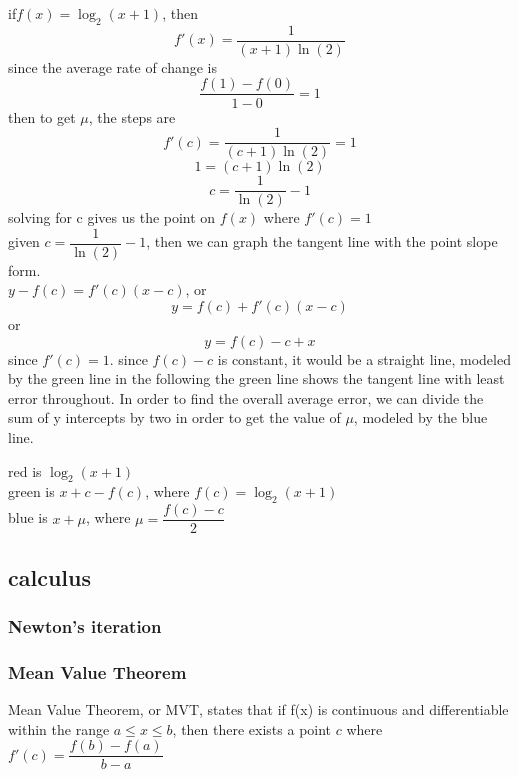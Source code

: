 \documentclass{article} %
\begin{document}
        \begin{center}
            if$f(x)=\log_2(x+1)$, then $$f'(x)=\dfrac{1}{(x+1)\ln(2)}$$since the average rate of change is $$\dfrac{f(1)-f(0)}{1-0}=1$$
            then to get $\mu$, the steps are $$f'(c)=\dfrac{1}{(c+1)\ln(2)}=1$$ $$1=(c+1)\ln(2)$$ $$c=\dfrac{1}{\ln(2)}-1$$
            solving for c gives us the point on $f(x)$ where $f'(c)=1$
            \\given $c=\dfrac{1}{\ln(2)}-1$, then we can graph the tangent line with the point slope form.\\ $y-f(c)=f'(c)(x-c)$, or
            $$y=f(c)+f'(c)(x-c)$$ or $$y=f(c)-c+x$$ since $f'(c)=1$. since $f(c)-c$ is constant, it would be a straight line, modeled by the green line in the following
            the green line shows the tangent line with least error throughout. In order to find the overall average error, we can divide the sum of y intercepts by two in order to get the value of $\mu$, modeled by the blue line.
            red is $\log_2(x+1)$\\
            green is $x+c-f(c)$, where $f(c)=\log_2(x+1)$\\
            blue is $x+\mu$, where $\mu=\dfrac{f(c)-c}{2}$
        \end{center}

            \subsection{calculus}
        \subsubsection{Newton's iteration}
        \subsubsection{Mean Value Theorem} %
        \label{ssub:Mean Value Theorem}
            Mean Value Theorem, or MVT, states that if f(x) is continuous and differentiable within the range $a\le x \le b$, then there exists a point $c$ where $f'(c) = \dfrac{f(b)-f(a)}{b-a}$
\end{document}

